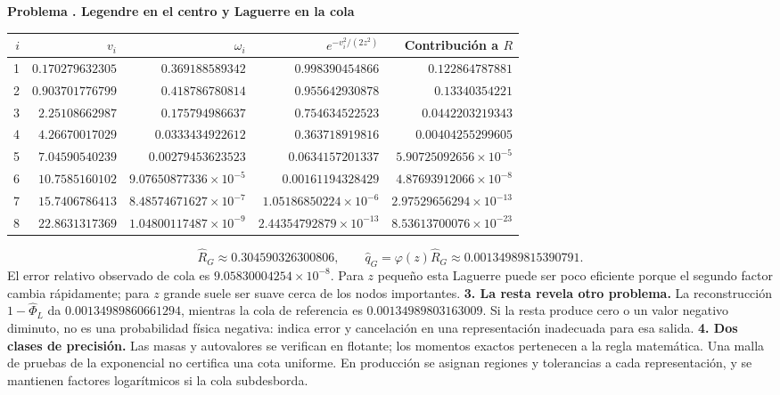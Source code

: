 \documentclass[11pt,a4paper]{article}
\theoremstyle{definition}
\newcounter{problema}
\newenvironment{resuelto}[1]{\refstepcounter{problema}\par\medskip\Needspace{6\baselineskip}\textbf{Problema \theproblema. #1}\par}{\par\medskip}
\begin{document}
\begin{resuelto}{Legendre en el centro y Laguerre en la cola}
\begin{center}\small\begin{tabular}{rrrrr}
\toprule
$i$&$v_i$&$\omega_i$&$e^{-v_i^2/(2z^2)}$&Contribución a $R$\\
\midrule
1&$0.170279632305$&$0.369188589342$&$0.998390454866$&$0.122864787881$\\
2&$0.903701776799$&$0.418786780814$&$0.955642930878$&$0.13340354221$\\
3&$2.25108662987$&$0.175794986637$&$0.754634522523$&$0.0442203219343$\\
4&$4.26670017029$&$0.0333434922612$&$0.363718919816$&$0.00404255299605$\\
5&$7.04590540239$&$0.00279453623523$&$0.0634157201337$&$5.90725092656\times10^{-5}$\\
6&$10.7585160102$&$9.07650877336\times10^{-5}$&$0.00161194328429$&$4.87693912066\times10^{-8}$\\
7&$15.7406786413$&$8.48574671627\times10^{-7}$&$1.05186850224\times10^{-6}$&$2.97529656294\times10^{-13}$\\
8&$22.8631317369$&$1.04800117487\times10^{-9}$&$2.44354792879\times10^{-13}$&$8.53613700076\times10^{-23}$\\
\bottomrule\end{tabular}\end{center}
\[
\widehat R_G\approx0.304590326300806,\qquad
\widehat q_G=\varphi(z)\widehat R_G\approx0.00134989815390791.
\]
El error relativo observado de cola es $9.05830004254\times10^{-8}$. Para $z$ pequeño esta Laguerre puede ser poco eficiente porque el segundo factor cambia rápidamente; para $z$ grande suele ser suave cerca de los nodos importantes.
\textbf{3. La resta revela otro problema.} La reconstrucción $1-\widehat\Phi_L$ da $0.00134989860661294$, mientras la cola de referencia es $0.00134989803163009$. Si la resta produce cero o un valor negativo diminuto, no es una probabilidad física negativa: indica error y cancelación en una representación inadecuada para esa salida.
\textbf{4. Dos clases de precisión.} Las masas y autovalores se verifican en flotante; los momentos exactos pertenecen a la regla matemática. Una malla de pruebas de la exponencial no certifica una cota uniforme. En producción se asignan regiones y tolerancias a cada representación, y se mantienen factores logarítmicos si la cola subdesborda.
\end{resuelto}
\end{document}
